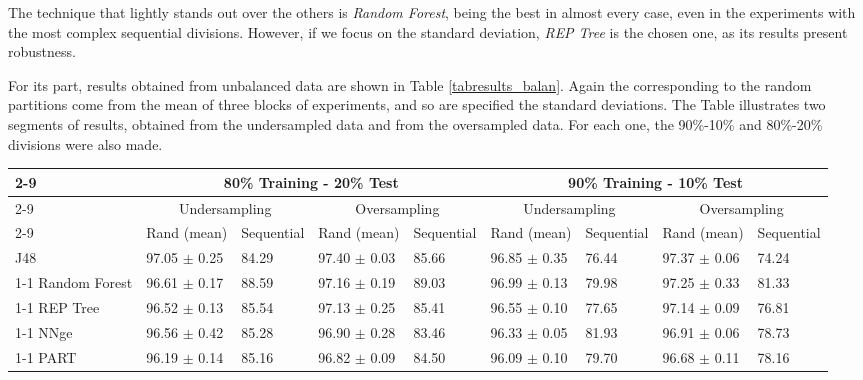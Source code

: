 \documentclass{llncs}
\begin{document}
The technique that lightly stands out over the others is
\textit{Random Forest}, being the best in almost every case, even in
the experiments with the most complex sequential divisions. However,
if we focus on the standard deviation, \textit{REP Tree} is the chosen
one, as its results present robustness. 

For its part, results obtained from unbalanced data are shown in Table \ref{tabresults_balan}. Again the corresponding to the random partitions come from the mean of three blocks of experiments, and so are specified the standard deviations. The Table illustrates two segments of results, obtained from the undersampled data and from the oversampled data. For each one, the 90\%-10\% and 80\%-20\% divisions were also made.

\begin{table*}[htpb]
\centering
 \caption{\label{tabresults_balan} Percentage of correctly classified patterns for balanced data (under- and oversampling)}
{\small
\begin{tabular}{|l|l|l|l|l|l|l|l|l|}
\cline{2-9}
\multicolumn{1}{l|}{} & \multicolumn{4}{c|}{80\% Training - 20\% Test} & \multicolumn{4}{c|}{90\% Training - 10\% Test} \\ 
\cline{2-9}
\multicolumn{1}{l|}{} & \multicolumn{2}{c|}{Undersampling} & \multicolumn{2}{c|}{Oversampling} & \multicolumn{2}{c|}{Undersampling} & \multicolumn{2}{c|}{Oversampling} \\ 
\cline{2-9}
\multicolumn{1}{l|}{} & Rand (mean) & Sequential & Rand (mean) & Sequential & Rand (mean) & Sequential & Rand (mean) & Sequential \\ 
\hline
J48 & 97.05 $\pm$ 0.25 & 84.29 & 97.40 $\pm$ 0.03 & 85.66 & 96.85 $\pm$ 0.35 & 76.44 & 97.37 $\pm$ 0.06 & 74.24 \\ 
\cline{1-1}
Random Forest & 96.61 $\pm$ 0.17 & 88.59 & 97.16 $\pm$ 0.19 & 89.03 & 96.99 $\pm$ 0.13 & 79.98 & 97.25 $\pm$ 0.33 & 81.33 \\ 
\cline{1-1}
REP Tree & 96.52 $\pm$ 0.13 & 85.54 & 97.13 $\pm$ 0.25 & 85.41 & 96.55 $\pm$ 0.10 & 77.65 & 97.14 $\pm$ 0.09 & 76.81 \\ 
\cline{1-1}
NNge & 96.56 $\pm$ 0.42 & 85.28 & 96.90 $\pm$ 0.28 & 83.46 & 96.33 $\pm$ 0.05 & 81.93 & 96.91 $\pm$ 0.06 & 78.73 \\ 
\cline{1-1}
PART & 96.19 $\pm$ 0.14 & 85.16 & 96.82 $\pm$ 0.09 & 84.50 & 96.09 $\pm$ 0.10 & 79.70 & 96.68 $\pm$ 0.11 & 78.16 \\ 
\hline
\end{tabular}
}
\end{table*}
\end{document}
